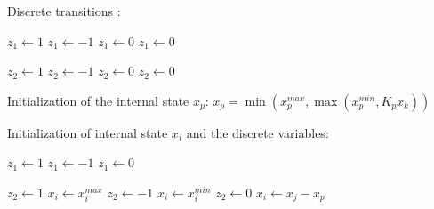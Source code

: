 \pagebreak
\vspace*{-9ex}
Discrete transitions : \hspace*{5ex}\begin{minipage}[t]{15cm}
\begin{algorithmic} 
    \STATE $z_1 \gets 1$
    \STATE $z_1 \gets -1$
  \ENDIF
{}
    \STATE $z_1 \gets 0$
  \ENDIF
{}
    \STATE $z_1 \gets 0$
  \ENDIF
\ENDIF
\end{algorithmic}
\begin{algorithmic} 
    \STATE $z_2 \gets 1$
    \STATE $z_2 \gets -1$
  \ENDIF
{}
    \STATE $z_2 \gets 0$
  \ENDIF
{}
    \STATE $z_2 \gets 0$
  \ENDIF
\ENDIF
\end{algorithmic}
\end{minipage}

\vspace*{2ex}

\pagebreak

Initialization of the internal state $x_p$: \hspace*{2ex} $x_p = \min \left( x_p^{max}, \max (x_p^{min}, K_p x_k)\right)$


\vspace*{1ex}
Initialization of internal state $x_i$ and the discrete variables: \hspace*{10ex}\begin{minipage}[t]{15cm}
\begin{algorithmic} 
   \STATE $z_1 \gets 1$
   \STATE $z_1 \gets -1$
\ELSE
   \STATE $z_1 \gets 0$
\ENDIF
\end{algorithmic}

\begin{algorithmic} 
   \STATE $z_2 \gets 1$
   \STATE $x_i \gets x_i^{max}$
   \STATE $z_2 \gets -1$
   \STATE $x_i \gets x_i^{min}$
\ELSE
   \STATE $z_2 \gets 0$
   \STATE $x_i \gets x_j - x_p$   
\ENDIF
\end{algorithmic}
\end{minipage}

